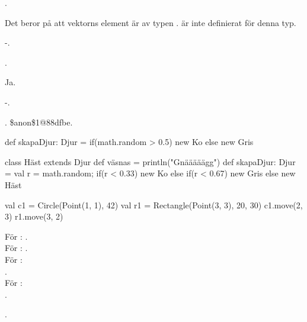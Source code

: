 

\ExerciseSolution{\ExeWeekSEVEN}

\BasicTasks %

\Task 

\Subtask {}.

\Subtask Det beror på att vektorns element är av typen .  är inte definierat för denna typ.

\Subtask -.

\Subtask {}.

\Subtask Ja.

\Subtask -.

\Subtask {}. \$anon\$1@88dfbe.

\Task 

\Subtask 
\begin{Code}
def skapaDjur: Djur = 
   {if(math.random > 0.5) new Ko else new Gris} 
\end{Code}

\Subtask 
\begin{Code}
class Häst extends Djur{ def väsnas = println("Gnääääägg") }
def skapaDjur: Djur = {val r = math.random; 
   if(r < 0.33) new Ko else if(r < 0.67) new Gris else new Häst}
\end{Code}

\Task 

\Subtask 
\begin{Code}
val c1 = Circle(Point(1, 1), 42)
val r1 = Rectangle(Point(3, 3), 20, 30)
c1.move(2, 3)
r1.move(3, 2)
\end{Code}
   
\Subtask För : . \\
För : . \\
För :  \\
. \\
För :  \\
. 
            
\Subtask {}.

